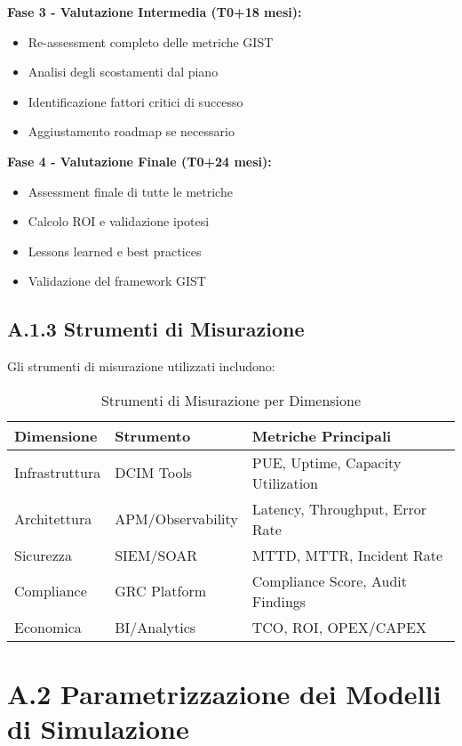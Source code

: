 \textbf{Fase 3 - Valutazione Intermedia (T0+18 mesi):}
\begin{itemize}
    \item Re-assessment completo delle metriche GIST
    \item Analisi degli scostamenti dal piano
    \item Identificazione fattori critici di successo
    \item Aggiustamento roadmap se necessario
\end{itemize}

\textbf{Fase 4 - Valutazione Finale (T0+24 mesi):}
\begin{itemize}
    \item Assessment finale di tutte le metriche
    \item Calcolo ROI e validazione ipotesi
    \item Lessons learned e best practices
    \item Validazione del framework GIST
\end{itemize}

\subsection{A.1.3 Strumenti di Misurazione}

Gli strumenti di misurazione utilizzati includono:

\begin{table}[htbp]
\centering
\caption{Strumenti di Misurazione per Dimensione}
\label{tab:strumenti_misurazione}
\begin{tabular}{llp{6cm}}
\toprule
\textbf{Dimensione} & \textbf{Strumento} & \textbf{Metriche Principali} \\
\midrule
Infrastruttura & DCIM Tools & PUE, Uptime, Capacity Utilization \\
Architettura & APM/Observability & Latency, Throughput, Error Rate \\
Sicurezza & SIEM/SOAR & MTTD, MTTR, Incident Rate \\
Compliance & GRC Platform & Compliance Score, Audit Findings \\
Economica & BI/Analytics & TCO, ROI, OPEX/CAPEX \\
\bottomrule
\end{tabular}
\end{table}

\section{A.2 Parametrizzazione dei Modelli di Simulazione}

